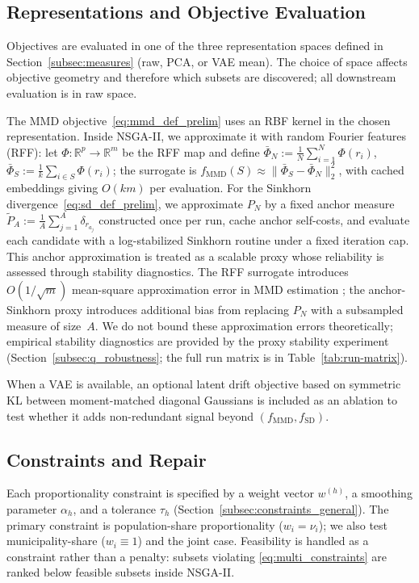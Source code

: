 \documentclass[10pt,journal]{IEEEtran}
\newcommand{\1}{\mathbf{1}}
\theoremstyle{ieeethm}
\begin{document}
\subsection{Representations and Objective Evaluation}

Objectives are evaluated in one of the three representation spaces defined in
Section~\ref{subsec:measures} (raw, PCA, or VAE mean). The choice of space affects objective
geometry and therefore which subsets are discovered; all downstream evaluation is in raw space.

The MMD objective~\eqref{eq:mmd_def_prelim} uses an RBF kernel in the chosen representation.
Inside NSGA-II, we approximate it with random Fourier features (RFF):
let $\Phi:\mathbb{R}^p\to\mathbb{R}^m$ be the RFF map and define
$\bar\Phi_N := \frac{1}{N}\sum_{i=1}^N \Phi(r_i)$, $\bar\Phi_S := \frac{1}{k}\sum_{i\in S} \Phi(r_i)$;
the surrogate is $f_{\mathrm{MMD}}(S)\approx\|\bar\Phi_S-\bar\Phi_N\|_2^2$, with cached embeddings giving $O(km)$ per evaluation.
For the Sinkhorn divergence~\eqref{eq:sd_def_prelim}, we approximate $P_N$ by a fixed anchor measure
$\tilde P_A := \frac{1}{A}\sum_{j=1}^{A}\delta_{r_{a_j}}$ constructed once per run, cache anchor self-costs, and evaluate each candidate with a log-stabilized Sinkhorn routine under a fixed iteration cap.
This anchor approximation is treated as a scalable proxy whose reliability is assessed through stability diagnostics.
The RFF surrogate introduces $O(1/\!\sqrt{m})$ mean-square approximation error in MMD estimation
\cite{rahimi2007random}; the anchor-Sinkhorn proxy introduces additional bias from replacing
$P_N$ with a subsampled measure of size~$A$. We do not bound these approximation errors
theoretically; empirical stability diagnostics are provided by the proxy stability experiment
(Section~\ref{subsec:q_robustness}; the full run matrix is in
Table~\ref{tab:run-matrix}).

When a VAE is available, an optional latent drift objective based on symmetric KL between moment-matched diagonal Gaussians is included as an ablation to test whether it adds non-redundant signal beyond $(f_{\mathrm{MMD}},f_{\mathrm{SD}})$.

\subsection{Constraints and Repair}

Each proportionality constraint is specified by a weight vector $w^{(h)}$, a smoothing
parameter $\alpha_h$, and a tolerance $\tau_h$ (Section~\ref{subsec:constraints_general}).
The primary constraint is population-share proportionality ($w_i=\nu_i$); we also test municipality-share ($w_i\equiv 1$) and the joint case.
Feasibility is handled as a constraint rather than a penalty: subsets violating
\eqref{eq:multi_constraints} are ranked below feasible subsets inside NSGA-II.
\end{document}
